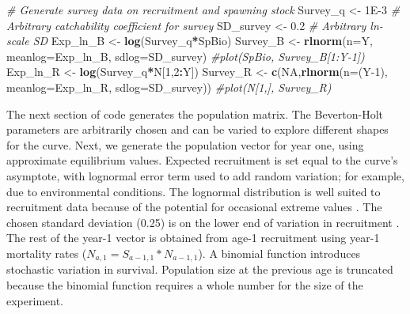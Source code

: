 \documentclass[
]{krantz}
\makeatletter
\newenvironment{Shaded}{\begin{snugshade}}{\end{snugshade}}
\newcommand{\AttributeTok}[1]{\textcolor[rgb]{0.27,0.27,0.27}{#1}}
\newcommand{\CommentTok}[1]{\textcolor[rgb]{0.37,0.37,0.37}{\textit{#1}}}
\newcommand{\ConstantTok}[1]{\textcolor[rgb]{0.37,0.37,0.37}{#1}}
\newcommand{\DecValTok}[1]{\textcolor[rgb]{0.06,0.06,0.06}{#1}}
\newcommand{\FloatTok}[1]{\textcolor[rgb]{0.06,0.06,0.06}{#1}}
\newcommand{\FunctionTok}[1]{\textcolor[rgb]{0.27,0.27,0.27}{\textbf{#1}}}
\newcommand{\NormalTok}[1]{#1}
\newcommand{\OtherTok}[1]{\textcolor[rgb]{0.37,0.37,0.37}{#1}}
\newcommand{\SpecialCharTok}[1]{\textcolor[rgb]{0.43,0.43,0.43}{\textbf{#1}}}
\newenvironment{kframe}{%
\medskip{}
\setlength{\fboxsep}{.8em}
 \def\at@end@of@kframe{}%
 \ifinner\ifhmode%
  \def\at@end@of@kframe{\end{minipage}}%
  \begin{minipage}{\columnwidth}%
 \fi\fi%
 \def\FrameCommand##1{\hskip\@totalleftmargin \hskip-\fboxsep
 \colorbox{shadecolor}{##1}\hskip-\fboxsep
     \hskip-\linewidth \hskip-\@totalleftmargin \hskip\columnwidth}%
 \MakeFramed {\advance\hsize-\width
   \@totalleftmargin\z@ \linewidth\hsize
   \@setminipage}}%
 {\par\unskip\endMakeFramed%
 \at@end@of@kframe}
\renewenvironment{Shaded}{\begin{kframe}}{\end{kframe}}
\makeatother
\begin{document}
\begin{Shaded}
\begin{Highlighting}[]
\CommentTok{\# Generate survey data on recruitment and spawning stock}
\NormalTok{Survey\_q }\OtherTok{\textless{}{-}} \FloatTok{1E{-}3} \CommentTok{\# Arbitrary catchability coefficient for survey}
\NormalTok{SD\_survey }\OtherTok{\textless{}{-}} \FloatTok{0.2} \CommentTok{\# Arbitrary ln{-}scale SD}
\NormalTok{Exp\_ln\_B }\OtherTok{\textless{}{-}} \FunctionTok{log}\NormalTok{(Survey\_q}\SpecialCharTok{*}\NormalTok{SpBio)}
\NormalTok{Survey\_B }\OtherTok{\textless{}{-}} \FunctionTok{rlnorm}\NormalTok{(}\AttributeTok{n=}\NormalTok{Y, }\AttributeTok{meanlog=}\NormalTok{Exp\_ln\_B, }\AttributeTok{sdlog=}\NormalTok{SD\_survey)}
\CommentTok{\#plot(SpBio, Survey\_B[1:Y{-}1])}
\NormalTok{Exp\_ln\_R }\OtherTok{\textless{}{-}} \FunctionTok{log}\NormalTok{(Survey\_q}\SpecialCharTok{*}\NormalTok{N[}\DecValTok{1}\NormalTok{,}\DecValTok{2}\SpecialCharTok{:}\NormalTok{Y])}
\NormalTok{Survey\_R }\OtherTok{\textless{}{-}} \FunctionTok{c}\NormalTok{(}\ConstantTok{NA}\NormalTok{,}\FunctionTok{rlnorm}\NormalTok{(}\AttributeTok{n=}\NormalTok{(Y}\DecValTok{{-}1}\NormalTok{), }\AttributeTok{meanlog=}\NormalTok{Exp\_ln\_R, }\AttributeTok{sdlog=}\NormalTok{SD\_survey))}
\CommentTok{\#plot(N[1,], Survey\_R)}
\end{Highlighting}
\end{Shaded}

The next section of code generates the population matrix. The Beverton-Holt parameters are arbitrarily chosen and can be varied to explore different shapes for the curve. Next, we generate the population vector for year one, using approximate equilibrium values. Expected recruitment is set equal to the curve's asymptote, with lognormal error term used to add random variation; for example, due to environmental conditions. The lognormal distribution is well suited to recruitment data because of the potential for occasional extreme values \citep{hilborn.walters_1992}. The chosen standard deviation (0.25) is on the lower end of variation in recruitment \citep{hightower.grossman_1985}. The rest of the year-1 vector is obtained from age-1 recruitment using year-1 mortality rates (\(N_{a,1}=S_{a-1,1}*N_{a-1,1}\)). A binomial function introduces stochastic variation in survival. Population size at the previous age is truncated because the binomial function requires a whole number for the size of the experiment.
\end{document}
